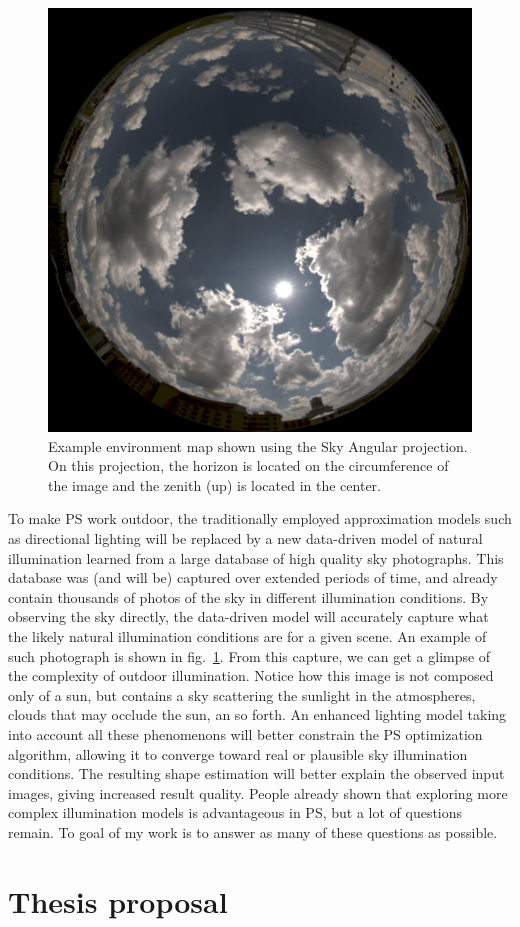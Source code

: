 \begin{figure}
\centering
\includegraphics[width=0.5\linewidth]{./figures/database/example.jpg}
\caption{Example environment map shown using the Sky Angular projection. On this projection, the horizon is located on the circumference of the image and the zenith (up) is located in the center.}
\label{fig:envmap_example}
\end{figure}


To make PS work outdoor, the traditionally employed approximation models such as directional lighting will be replaced by a new data-driven model of natural illumination learned from a large database of high quality sky photographs. This database was (and will be) captured over extended periods of time, and already contain thousands of photos of the sky in different illumination conditions. By observing the sky directly, the data-driven model will accurately capture what the likely natural illumination conditions are for a given scene. An example of such photograph is shown in fig.~\ref{fig:envmap_example}. From this capture, we can get a glimpse of the complexity of outdoor illumination. Notice how this image is not composed only of a sun, but contains a sky scattering the sunlight in the atmospheres, clouds that may occlude the sun, an so forth. An enhanced lighting model taking into account all these phenomenons will better constrain the PS optimization algorithm, allowing it to converge toward real or plausible sky illumination conditions. The resulting shape estimation will better explain the observed input images, giving increased result quality. People already shown that exploring more complex illumination models is advantageous in PS, but a lot of questions remain. To goal of my work is to answer as many of these questions as possible.


\section{Thesis proposal}

